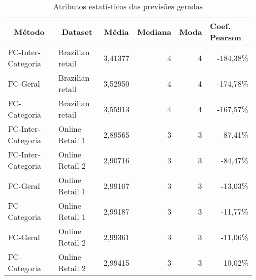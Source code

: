 \begin{table}[ht]
\begin{tabular}{@{}llrrrr@{}}
\toprule
\multicolumn{1}{c}{\textbf{Método}} & \multicolumn{1}{c}{\textbf{Dataset}} & \multicolumn{1}{c}{\textbf{Média}} & \multicolumn{1}{c}{\textbf{Mediana}} & \multicolumn{1}{c}{\textbf{Moda}} & \multicolumn{1}{l}{\textbf{Coef. Pearson}} \\ \midrule
FC-Inter-Categoria                  & Brazilian retail                     & 3,41377                            & 4                                    & 4                                 & -184,38\%                                  \\
FC-Geral                            & Brazilian retail                     & 3,52950                            & 4                                    & 4                                 & -174,78\%                                  \\
FC-Categoria                        & Brazilian retail                     & 3,55913                            & 4                                    & 4                                 & -167,57\%                                  \\
FC-Inter-Categoria                  & Online Retail 1                      & 2,89565                            & 3                                    & 3                                 & -87,41\%                                   \\
FC-Inter-Categoria                  & Online Retail 2                      & 2,90716                            & 3                                    & 3                                 & -84,47\%                                   \\
FC-Geral                            & Online Retail 1                      & 2,99107                            & 3                                    & 3                                 & -13,03\%                                   \\
FC-Categoria                        & Online Retail 1                      & 2,99187                            & 3                                    & 3                                 & -11,77\%                                   \\
FC-Geral                            & Online Retail 2                      & 2,99361                            & 3                                    & 3                                 & -11,06\%                                   \\
FC-Categoria                        & Online Retail 2                      & 2,99415                            & 3                                    & 3                                 & -10,02\%                                   \\ \bottomrule
\end{tabular}
\caption{Atributos estatísticos das previsões geradas}
\label{tab:analise-ds}
\end{table}


